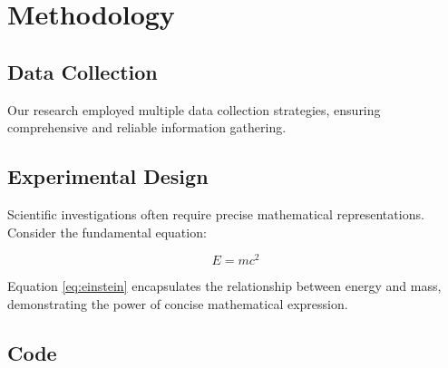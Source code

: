 \section{Methodology}
\subsection{Data Collection}
Our research employed multiple data collection strategies, ensuring comprehensive and reliable information gathering.

\subsection{Experimental Design}
Scientific investigations often require precise mathematical representations. Consider the fundamental equation:

\begin{equation}
E = mc^2 \label{eq:einstein}
\end{equation}

Equation \ref{eq:einstein} encapsulates the relationship between energy and mass, demonstrating the power of concise mathematical expression.

\subsection{Code}



